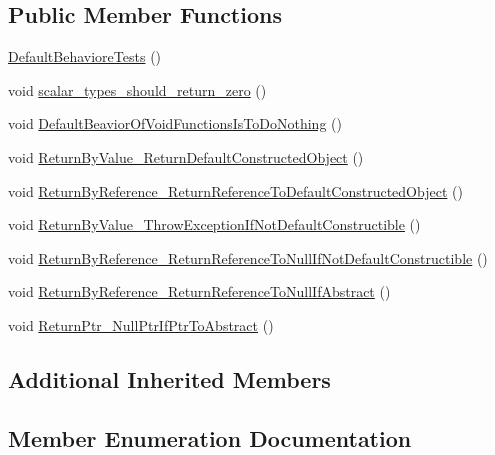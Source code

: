 \subsection*{Public Member Functions}
\begin{DoxyCompactItemize}
\item 
\mbox{\hyperlink{structDefaultBehavioreTests_a4d5d2d565f2ada8e6ca7fc3c7f626628}{Default\+Behaviore\+Tests}} ()
\item 
void \mbox{\hyperlink{structDefaultBehavioreTests_a24de0052773fd78589e47a42de16f41c}{scalar\+\_\+types\+\_\+should\+\_\+return\+\_\+zero}} ()
\item 
void \mbox{\hyperlink{structDefaultBehavioreTests_a0337e78717f337c870e93e48764cd917}{Default\+Beavior\+Of\+Void\+Functions\+Is\+To\+Do\+Nothing}} ()
\item 
void \mbox{\hyperlink{structDefaultBehavioreTests_a67c4e084ab4a9367946a9082f5a3e46e}{Return\+By\+Value\+\_\+\+Return\+Default\+Constructed\+Object}} ()
\item 
void \mbox{\hyperlink{structDefaultBehavioreTests_ac15983a73295b270d69285934c386ab9}{Return\+By\+Reference\+\_\+\+Return\+Reference\+To\+Default\+Constructed\+Object}} ()
\item 
void \mbox{\hyperlink{structDefaultBehavioreTests_a16473ca0cd9e579381d8a4e76047b3ca}{Return\+By\+Value\+\_\+\+Throw\+Exception\+If\+Not\+Default\+Constructible}} ()
\item 
void \mbox{\hyperlink{structDefaultBehavioreTests_a68e82dc645e6680c1112d4fef088bb6e}{Return\+By\+Reference\+\_\+\+Return\+Reference\+To\+Null\+If\+Not\+Default\+Constructible}} ()
\item 
void \mbox{\hyperlink{structDefaultBehavioreTests_aa5e737df1a9b39bef16c72ca731f745b}{Return\+By\+Reference\+\_\+\+Return\+Reference\+To\+Null\+If\+Abstract}} ()
\item 
void \mbox{\hyperlink{structDefaultBehavioreTests_af46dde91c7bf697c0367caaa85a8cba6}{Return\+Ptr\+\_\+\+Null\+Ptr\+If\+Ptr\+To\+Abstract}} ()
\end{DoxyCompactItemize}
\subsection*{Additional Inherited Members}


\subsection{Member Enumeration Documentation}
\mbox{\label{structDefaultBehavioreTests_a0125c0fb6d312ce842f4106491751506}} 
